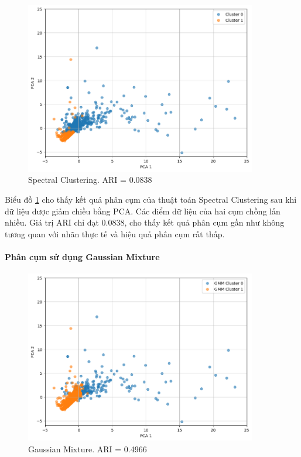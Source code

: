     \begin{figure}[htp]
        \centering
        \includegraphics[width=0.90\textwidth]{images/Img_fire_spectral.png}
        \caption{Spectral Clustering. ARI = 0.0838}
        \label{fig:Img_fire_spectral}
    \end{figure}
    \FloatBarrier

    Biểu đồ \ref{fig:Img_fire_spectral} cho thấy kết quả phân cụm của thuật toán Spectral Clustering sau khi dữ liệu được giảm chiều bằng PCA. Các điểm dữ liệu của hai cụm chồng lấn nhiều. Giá trị ARI chỉ đạt 0.0838, cho thấy kết quả phân cụm gần như không tương quan với nhãn thực tế và hiệu quả phân cụm rất thấp.
    

    \paragraph{Phân cụm sử dụng Gaussian Mixture}
    \leavevmode
    
    \begin{figure}[htp]
        \centering
        \includegraphics[width=0.90\textwidth]{images/Img_fire_gauss.png}
        \caption{Gaussian Mixture. ARI = 0.4966}
        \label{fig:Img_fire_gauss}
    \end{figure}
    \FloatBarrier

